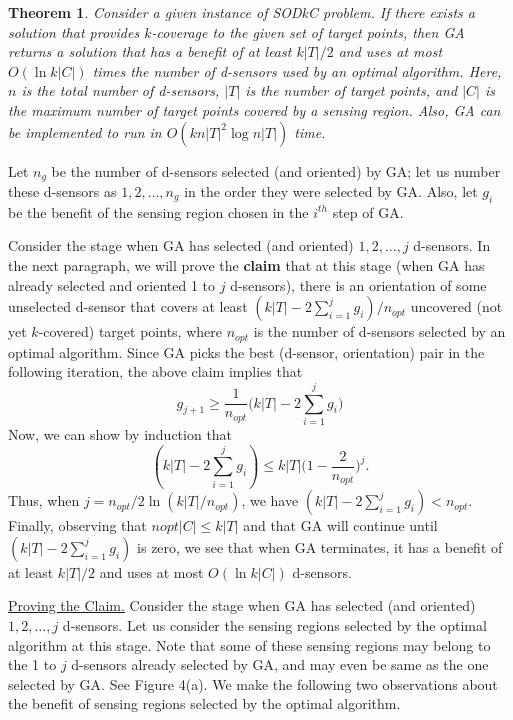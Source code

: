 \documentclass[conference]{IEEEtran}
\newtheorem{theorem}{Theorem}
\newenvironment{proof_}{{\indent \indent \it Proof:}}{\hfill $\blacksquare$\par}
\theoremstyle{definition}
\newtheorem*{NP-Hardness of Approximating the SODkC Problem}{NP-Hardness of Approximating the SODkC Problem}
\newtheorem*{Greedy Algorithm (GA)}{Greedy Algorithm (GA)}
\newtheorem*{GA on the Running Example}{GA on the Running Example}
\newtheorem*{Performance Guarantee of GA}{Performance Guarantee of GA}
\begin{document}
\begin{theorem}
Consider a given instance of SODkC problem. If there exists a solution that provides $k$-coverage to the given set of target points, then GA returns a solution that has a benefit of at least $k|T|/2$ and uses at most $O(\ln k|C|)$ times the number of d-sensors used by an optimal algorithm. Here, $n$ is the total number of d-sensors, $|T|$ is the number of target points, and $|C|$ is the maximum number of target points covered by a sensing region. Also, GA can be implemented to run in $O(kn|T|^2 \log n|T|)$ time.
\end{theorem}

\begin{proof_}
Let $n_g$ be the number of d-sensors selected (and oriented) by GA; let us number these d-sensors as $1, 2,\dots,n_g$ in the order they were selected by GA. Also, let $g_i$ be the benefit of the sensing region chosen in the $i^{th}$ step of GA.
\end{proof_}

Consider the stage when GA has selected (and oriented) $1, 2,\dots,j$ d-sensors. In the next paragraph, we will prove the \textbf{claim} that at this stage (when GA has already selected and oriented 1 to $j$ d-sensors), there is an orientation of some unselected d-sensor that covers at least $(k|T| - 2\sum_{i=1}^j g_i)/n_{opt}$ uncovered (not yet $k$-covered) target points, where $n_{opt}$ is the number of d-sensors selected by an optimal algorithm. Since GA picks the best (d-sensor, orientation) pair in the following iteration, the above claim implies that
\begin{equation*}
    g_{j + 1} \geq \frac{1}{n_{opt}} \Bigg(k|T| - 2\sum_{i=1}^j g_i \Bigg)
\end{equation*}
Now, we can show by induction that
\begin{equation*}
    (k|T| - 2\sum_{i=1}^j g_i) \leq k|T| \Bigg(1 -\frac{2}{n_{opt}}\Bigg)^j.
\end{equation*}
Thus, when $j = n_{opt}/2 \ln(k|T|/n_{opt})$, we have $(k|T| - 2\sum_{i=1}^j g_i) < n_{opt}$. Finally, observing that $nopt|C| \leq k|T|$ and that GA will continue until $(k|T| - 2\sum_{i=1}^j g_i)$ is zero, we see that when GA terminates, it has a benefit of at least $k|T|/2$ and uses at most $O(\ln k|C|)$ d-sensors.

\noindent\underline{Proving the Claim.} Consider the stage when GA has selected (and oriented) $1, 2,\dots,j$ d-sensors. Let us consider the sensing regions selected by the optimal algorithm at this stage. Note that some of these sensing regions may belong to the 1 to $j$ d-sensors already selected by GA, and may even be same as the one selected by GA. See Figure 4(a). We make the following two observations about the benefit of sensing regions selected by the optimal algorithm.
\end{document}
